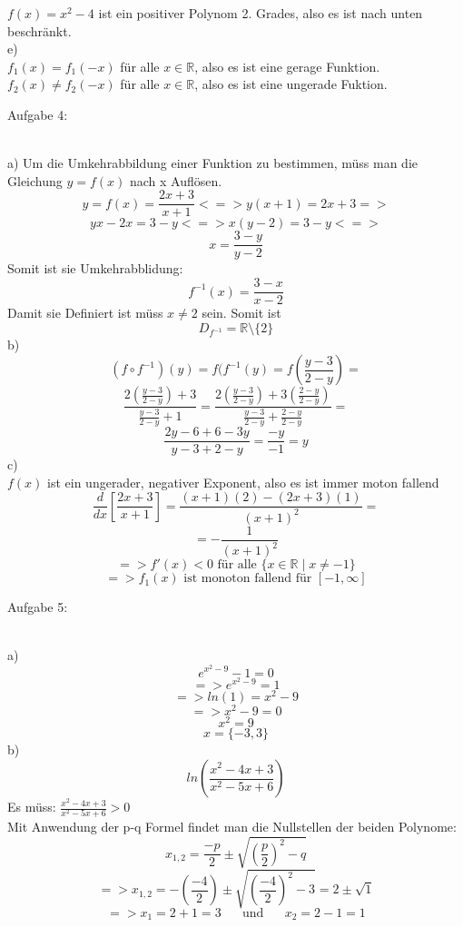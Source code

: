 \documentclass[11pt]{article}
\begin{document}
			$f(x)=x^2-4$ ist ein positiver Polynom 2. Grades, also es ist nach unten beschränkt.\\
			\indent e)\\
				$f_1(x)=f_1(-x)$ für alle $x\in\mathbb{R}$, also es ist eine gerage Funktion.\\
				$f_2(x) \neq f_2(-x)$ für alle $x\in\mathbb{R}$, also es ist eine ungerade Fuktion.\\
		\noindent \begin{Large}Aufgabe 4:\end{Large}\\[2pt]
			\indent a)
				Um die Umkehrabbildung einer Funktion zu bestimmen, müss man die Gleichung $y=f(x)$ nach x Auflösen.
				$$y=f(x)=\frac{2x+3}{x+1} <=> y(x+1)=2x+3=>$$
				$$yx-2x=3-y <=> x(y-2)=3-y<=>$$
				$$x=\frac{3-y}{y-2}$$
				Somit ist sie Umkehrabblidung:
				$$f^{-1}(x)=\frac{3-x}{x-2}$$
				Damit sie Definiert ist müss $x \neq 2$ sein. Somit ist
				$$D_{f^{-1}}=\mathbb{R}\setminus\{2\}$$
			\indent b)
				$$(f \circ f^{-1})(y) = f(f^{-1}(y)=f\left(\frac{y-3}{2-y}\right)=$$
				$$\frac{2\left(\frac{y-3}{2-y}\right)+3}{\frac{y-3}{2-y}+1}=\frac{2\left(\frac{y-3}{2-y}\right)+3\left(\frac{2-y}{2-y}\right)}{\frac{y-3}{2-y}+\frac{2-y}{2-y}}=$$
				$$\frac{2y-6+6-3y}{y-3+2-y}=\frac{-y}{-1}=y$$
			\indent c)\\
				$f(x)$ ist ein ungerader, negativer Exponent, also es ist immer moton fallend\\
				$$\frac{d}{dx}\left[\frac{2x+3}{x+1}\right]=\frac{(x+1)(2)-(2x+3)(1)}{(x+1)^2}=$$
				$$=-\frac{1}{(x+1)^2}$$
				$$=> f'(x)<0  \mbox{ für alle } \{x \in \mathbb{R} \mid x \neq -1\}$$
				$$=> f_1(x) \mbox{ ist monoton fallend  für }[-1,\infty] $$		
		\noindent \begin{Large}Aufgabe 5:\end{Large}\\[2pt]
			\indent a)
				$$e^{x^2-9}-1=0$$
				$$=> e^{x^2-9}=1$$
				$$=>ln(1)=x^2-9$$
				$$=>x^2-9=0$$
				$$x^2=9$$
				$$x=\{-3,3\}$$
			\indent b)
						$$ln\left(\frac{x^2-4x+3}{x^2-5x+6}\right)$$
						Es müss: $\frac{x^2-4x+3}{x^2-5x+6} >0$\\
						Mit Anwendung der p-q Formel findet man die Nullstellen der beiden Polynome:\\
						$$x_{1,2}=\frac{-p}{2}\pm \sqrt{\left(\frac{p}{2}\right)^2-q}$$
						$$=>x_{1,2}=-\left(\frac{-4}{2}\right)\pm \sqrt{\left(\frac{-4}{2}\right)^2-3}=2 \pm \sqrt{1}$$
						$$=>x_1 = 2+1=3 \hspace{20pt}\mbox{und}\hspace{20pt} x_2 = 2-1=1$$
\end{document}
